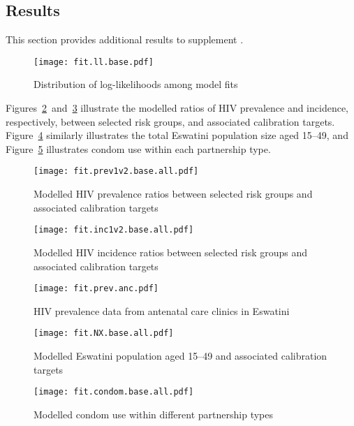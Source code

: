 \subsection{Results}\label{app.model.cal.res}
This section provides additional results to supplement .
\begin{figure}[h]
  \centering\texttt{[image: fit.ll.base.pdf]}
  \caption{Distribution of log-likelihoods among model fits}
  \label{fig:fit.ll}
\end{figure}
\par
Figures~\ref{fig:fit.prev1v2}~and~\ref{fig:fit.inc1v2}
illustrate the modelled ratios of HIV prevalence and incidence, respectively,
between selected risk groups, and associated calibration targets.
Figure~\ref{fig:fit.pop} similarly illustrates the total Eswatini population size aged 15--49, and
Figure~\ref{fig:fit.condom} illustrates condom use within each partnership type.
\begin{figure}[h]
  \centering\texttt{[image: fit.prev1v2.base.all.pdf]}
  \caption{Modelled HIV prevalence ratios between selected risk groups
    and associated calibration targets}
  \label{fig:fit.prev1v2}
\end{figure}
\begin{figure}[h]
  \centering\texttt{[image: fit.inc1v2.base.all.pdf]}
  \caption{Modelled HIV incidence ratios between selected risk groups
    and associated calibration targets}
  \label{fig:fit.inc1v2}
\end{figure}
\begin{figure}[h]
  \begin{minipage}[t]{.54\linewidth}
    \centering\texttt{[image: fit.prev.anc.pdf]}
    \caption{HIV prevalence data from antenatal care clinics in Eswatini}
    \label{fig:fit.prev.anc}
  \end{minipage}\hfill
  \begin{minipage}[t]{.44\linewidth}
    \centering\texttt{[image: fit.NX.base.all.pdf]}
    \caption{Modelled Eswatini population aged 15--49
    and associated calibration targets}
    \label{fig:fit.pop}
  \end{minipage}
\end{figure}
\begin{figure}[h]
  \centering\texttt{[image: fit.condom.base.all.pdf]}
  \caption{Modelled condom use within different partnership types}
  \label{fig:fit.condom}
\end{figure}
